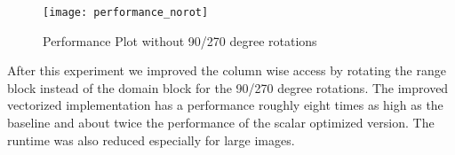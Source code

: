 \begin{figure}[h]
  \centering
  \texttt{[image: performance\_norot]}
  \caption{Performance Plot without 90/270 degree rotations}
  \label{fig:perf_40_41}
\end{figure}


After this experiment we improved the column wise access by rotating the range
block instead of the domain block for the 90/270 degree rotations. The improved
vectorized implementation has a performance roughly eight times as high as the
baseline and about twice the performance of the scalar optimized version. The
runtime was also reduced especially for large images.
